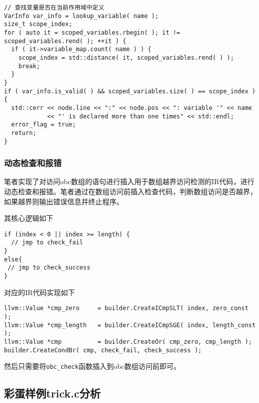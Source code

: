 \documentclass[../main.tex]{subfiles}
\begin{document}
\begin{mdframed}
	\begin{verbatim}
// 查找变量是否在当前作用域中定义
VarInfo var_info = lookup_variable( name );
size_t scope_index;
for ( auto it = scoped_variables.rbegin( ); it != scoped_variables.rend( ); ++it ) {
  if ( it->variable_map.count( name ) ) {
    scope_index = std::distance( it, scoped_variables.rend( ) );
    break;
  }
}
if ( var_info.is_valid( ) && scoped_variables.size( ) == scope_index ) {
  std::cerr << node.line << ":" << node.pos << ": variable '" << name
            << "' is declared more than one times" << std::endl;
  error_flag = true;
  return;
}
  \end{verbatim}
\end{mdframed}

\subsubsection{动态检查和报错}

笔者实现了对访问obc数组的语句进行插入用于数组越界访问检测的IR代码，进行动态检查和报错。笔者通过在数组访问前插入检查代码，判断数组访问是否越界，如果越界则输出错误信息并终止程序。

其核心逻辑如下

\begin{mdframed}
	\begin{verbatim}
if (index < 0 || index >= length) {
  // jmp to check_fail
}
else{
 // jmp to check_success
}
  \end{verbatim}
\end{mdframed}

对应的IR代码实现如下

\begin{mdframed}
	\begin{verbatim}
llvm::Value *cmp_zero     = builder.CreateICmpSLT( index, zero_const );
llvm::Value *cmp_length   = builder.CreateICmpSGE( index, length_const );
llvm::Value *cmp          = builder.CreateOr( cmp_zero, cmp_length );
builder.CreateCondBr( cmp, check_fail, check_success );
  \end{verbatim}
\end{mdframed}

然后只需要将\texttt{obc\_check}函数插入到obc数组访问前即可。

\subsection{彩蛋样例trick.c分析}
\end{document}
